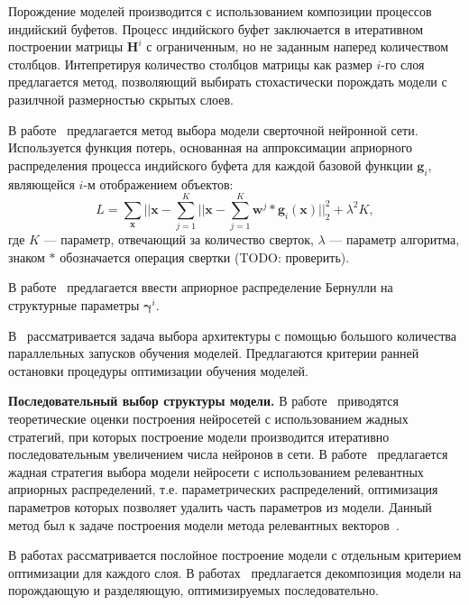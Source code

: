 Порождение моделей производится с использованием композиции процессов индийский буфетов. Процесс индийского буфет заключается в итеративном построении матрицы $\mathbf{H}^i$ с ограниченным, но не заданным наперед количеством столбцов. Интепретируя количество столбцов  матрицы как размер $i$-го слоя предлагается метод, позволяющий выбирать стохастически порождать модели с разилчной размерностью скрытых слоев. 

В работе~\cite{cib_simple} предлагается метод выбора модели сверточной нейронной сети. Используется функция потерь, основанная на аппроксимации априорного распределения процесса индийского буфета для каждой базовой функции $\mathbf{g}_i$, являющейся $i$-м отображением объектов:
\[
    L = \sum_{\mathbf{x}}||\mathbf{x} - \sum_{j=1}^K ||\mathbf{x} - \sum_{j=1}^K \mathbf{w}^j * \mathbf{g}_i(\mathbf{x})||_2^2 + \lambda^2K,
\]
где $K$ --- параметр, отвечающий за количество сверток, $\lambda$ --- параметр алгоритма, знаком $*$ обозначается операция свертки (TODO: проверить).

В работе~\cite{shirakawa2018dynamic} предлагается ввести априорное распределение Бернулли на структурные параметры $\boldsymbol{\gamma}^i$.

В~\cite{optimal_racing} рассматривается задача выбора архитектуры с помощью большого количества параллельных запусков обучения моделей. Предлагаются критерии ранней остановки процедуры оптимизации обучения моделей.

\par{\textbf{Последовательный выбор структуры модели. }}
В работе~\cite{greed} приводятся теоретические оценки построения нейросетей с использованием жадных стратегий,  при которых построение модели производится итеративно последовательным увеличением числа нейронов в сети. В работе~\cite{greed_mlp} предлагается жадная стратегия выбора модели нейросети с использованием релевантных априорных распределений, т.е. параметрических распределений, оптимизация параметров которых позволяет удалить часть параметров из модели. Данный метод был к задаче построения модели метода релевантных векторов~\cite{rvm}. 

В работах\cite{Bengio, hd} рассматривается послойное построение модели с отдельным критерием оптимизации для каждого слоя. В работах~\cite{Kingma, gendis_pictures, gendis_phd} предлагается декомпозиция модели на порождающую и разделяющую, оптимизируемых последовательно. 

